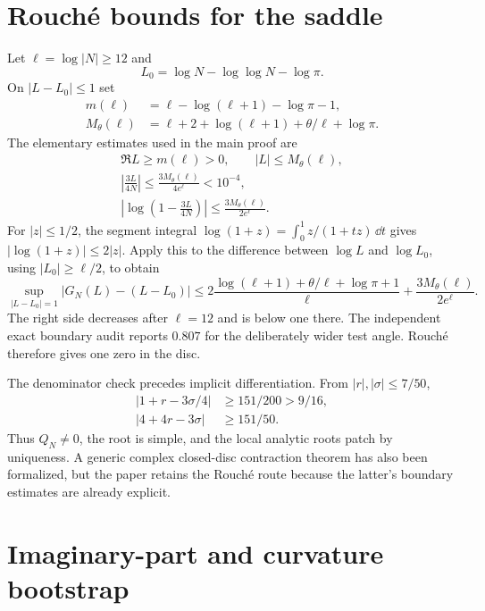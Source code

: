 \documentclass[10pt]{article}
\begin{document}
\section{Rouch\'e bounds for the saddle}\label{sup:rouche}

Let $\ell=\log|N|\ge12$ and
\[
 L_0=\log N-\log\log N-\log\pi.
\]
On $|L-L_0|\le1$ set
\begin{align*}
 m(\ell)&=\ell-\log(\ell+1)-\log\pi-1,\\
 M_\theta(\ell)&=\ell+2+\log(\ell+1)+\theta/\ell+\log\pi.
\end{align*}
The elementary estimates used in the main proof are
\begin{gather}
 \Re L\ge m(\ell)>0,\qquad |L|\le M_\theta(\ell),\label{sup:disc-geometry}\\
 \left|\frac{3L}{4N}\right|
 \le\frac{3M_\theta(\ell)}{4e^\ell}<10^{-4},\label{sup:small-correction}\\
 \left|\log\left(1-\frac{3L}{4N}\right)\right|
 \le\frac{3M_\theta(\ell)}{2e^\ell}.
 \label{sup:log-correction}
\end{gather}
For $|z|\le1/2$, the segment integral
$\log(1+z)=\int_0^1z/(1+tz)\,\dd t$ gives
$|\log(1+z)|\le2|z|$.  Apply this to the difference between $\log L$ and
$\log L_0$, using $|L_0|\ge\ell/2$, to obtain
\begin{equation}\label{sup:rouche-full}
 \sup_{|L-L_0|=1}|G_N(L)-(L-L_0)|
 \le2\frac{\log(\ell+1)+\theta/\ell+\log\pi+1}{\ell}
 +\frac{3M_\theta(\ell)}{2e^\ell}.
\end{equation}
The right side decreases after $\ell=12$ and is below one there.  The
independent exact boundary audit reports $0.807$ for the deliberately wider
test angle.  Rouch\'e therefore gives one zero in the disc.

The denominator check precedes implicit differentiation.  From
$|r|,|\sigma|\le7/50$,
\begin{align}
 |1+r-3\sigma/4|&\ge151/200>9/16,\label{sup:Q-lower}\\
 |4+4r-3\sigma|&\ge151/50.\label{sup:H6-den-lower}
\end{align}
Thus $Q_N\ne0$, the root is simple, and the local analytic roots patch by
uniqueness.  A generic complex closed-disc contraction theorem has also been
formalized, but the paper retains the Rouch\'e route because the latter's
boundary estimates are already explicit.

\section{Imaginary-part and curvature bootstrap}\label{sup:imaginary}
\end{document}
